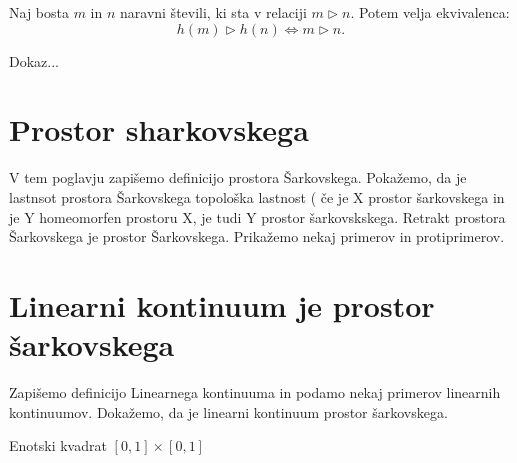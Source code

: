 \documentclass[mat2]{fmfdelo}
\begin{document}
\begin{lema}
Naj bosta $m$ in $n$ naravni števili, ki sta v relaciji $m \triangleright n$. Potem velja ekvivalenca:
$$h(m) \triangleright h(n) \iff m \triangleright n.$$
\end{lema}
\begin{dokaz}
Dokaz...
\end{dokaz}


\section{Prostor sharkovskega}
V tem poglavju zapišemo definicijo prostora Šarkovskega. Pokažemo, da je lastnsot prostora Šarkovskega topološka lastnost ( če je X prostor šarkovskega in je Y homeomorfen prostoru X, je tudi Y prostor šarkovskskega. Retrakt prostora Šarkovskega je prostor Šarkovskega. Prikažemo nekaj primerov in protiprimerov.
\section{Linearni kontinuum je prostor šarkovskega}
Zapišemo definicijo Linearnega kontinuuma in podamo nekaj primerov linearnih kontinuumov. Dokažemo, da je linearni kontinuum prostor šarkovskega.
\begin{primer}
Enotski kvadrat $[0, 1] \times [0, 1]$ 
\end{primer}




\cleardoublepage                           %

\cleardoublepage                           %
\printindex
\end{document}
